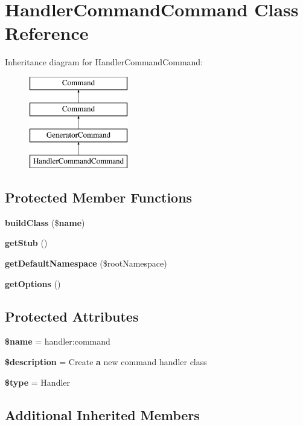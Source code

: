 \section{Handler\+Command\+Command Class Reference}
\label{class_illuminate_1_1_foundation_1_1_console_1_1_handler_command_command}
Inheritance diagram for Handler\+Command\+Command\+:\begin{figure}[H]
\begin{center}
\leavevmode
\includegraphics[height=4.000000cm]{class_illuminate_1_1_foundation_1_1_console_1_1_handler_command_command}
\end{center}
\end{figure}
\subsection*{Protected Member Functions}
\begin{DoxyCompactItemize}
\item 
{\bf build\+Class} (\${\bf name})
\item 
{\bf get\+Stub} ()
\item 
{\bf get\+Default\+Namespace} (\$root\+Namespace)
\item 
{\bf get\+Options} ()
\end{DoxyCompactItemize}
\subsection*{Protected Attributes}
\begin{DoxyCompactItemize}
\item 
{\bf \$name} = \textquotesingle{}handler\+:command\textquotesingle{}
\item 
{\bf \$description} = \textquotesingle{}Create {\bf a} new command handler class\textquotesingle{}
\item 
{\bf \$type} = \textquotesingle{}Handler\textquotesingle{}
\end{DoxyCompactItemize}
\subsection*{Additional Inherited Members}


